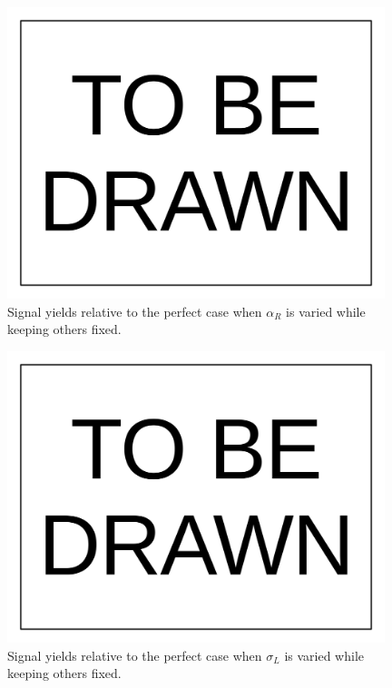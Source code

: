 \documentclass[10pt,a4paper,onecolumn]{	article}
\begin{document}
\begin{figure}
\includegraphics[width=110mm]{ToBeDrawn.pdf}
\caption{Signal yields relative to the perfect case when $\alpha_R$ is varied while keeping others fixed.}
\label{Figure_RelativeYieldChangingAlphaROnly}
\end{figure}

\begin{figure}
\includegraphics[width=110mm]{ToBeDrawn.pdf}
\caption{Signal yields relative to the perfect case when $\sigma_L$ is varied while keeping others fixed.}
\label{Figure_RelativeYieldChangingSigmaLOnly}
\end{figure}
\end{document}
